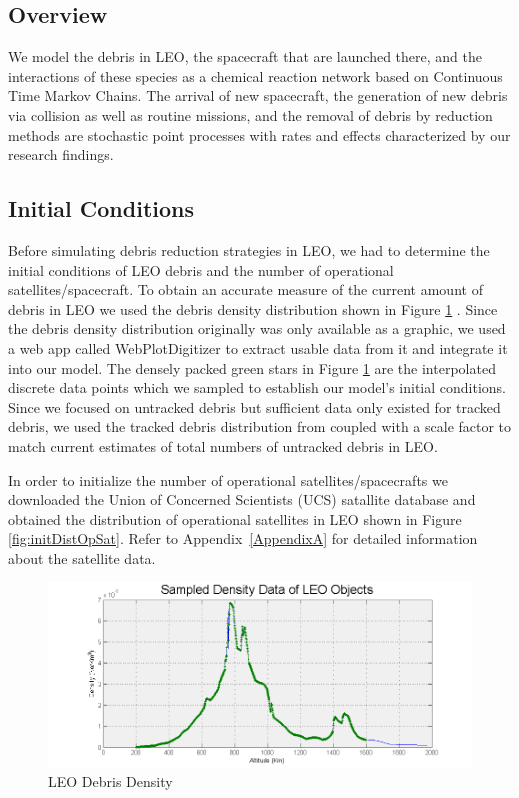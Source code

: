 \documentclass[pre,12pt]{revtex4-1}
\begin{document}
\subsection{Overview}
We model the debris in LEO, the spacecraft that are launched there, and the interactions of these species as a chemical reaction network based on Continuous Time Markov Chains. The arrival of new spacecraft, the generation of new debris via collision as well as routine missions, and the removal of debris by reduction methods are stochastic point processes with rates and effects characterized by our research findings.

\subsection{Initial Conditions}
Before simulating debris reduction strategies in LEO, we had to determine the initial conditions of LEO debris and the number of operational satellites/spacecraft. To obtain an accurate measure of the current amount of debris in LEO we used the debris density distribution shown in Figure \ref{fig:debris_density} \cite{NasaLEODensity}. Since the debris density distribution originally was only available as a graphic, we used a web app called WebPlotDigitizer \cite{webPlotDigitizer} to extract usable data from it and integrate it into our model. The densely packed green stars in Figure \ref{fig:debris_density} are the interpolated discrete data points which we sampled to establish our model's initial conditions. Since we focused on untracked debris but sufficient data only existed for tracked debris, we used the tracked debris distribution from \cite{NasaLEODensity} coupled with a scale factor to match current estimates of total numbers of untracked debris in LEO.

In order to initialize the number of operational satellites/spacecrafts we downloaded the Union of Concerned Scientists (UCS) satallite database \cite{satelliteDB} and obtained the distribution of operational satellites in LEO shown in Figure \ref{fig:initDistOpSat}. Refer to Appendix~\ref{AppendixA} for detailed information about the satellite data.

\begin{figure}[h]
	\includegraphics[width=.8\linewidth]{"Figures/density_data"}
	\caption{\footnotesize LEO Debris Density}
	\label{fig:debris_density}
\end{figure}
\end{document}
